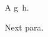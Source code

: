 \documentclass{article}
\begin{document}
A \begingroup\ul g\endgroup\ h.

Next para.
\end{document}
